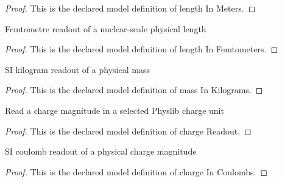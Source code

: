 \begin{proof}
  This is the declared model definition of length In Meters.
\end{proof}
\begin{definition}
  \label{def:physics:phyx-mini-0635:phyxminiproblems-problemphyxmini0635-lengthinfemtometers}
  Femtometre readout of a nuclear-scale physical length
\end{definition}
\begin{proof}
  This is the declared model definition of length In Femtometers.
\end{proof}
\begin{definition}
  \label{def:physics:phyx-mini-0635:phyxminiproblems-problemphyxmini0635-massinkilograms}
  SI kilogram readout of a physical mass
\end{definition}
\begin{proof}
  This is the declared model definition of mass In Kilograms.
\end{proof}
\begin{definition}
  \label{def:physics:phyx-mini-0635:phyxminiproblems-problemphyxmini0635-chargereadout}
  Read a charge magnitude in a selected Physlib charge unit
\end{definition}
\begin{proof}
  This is the declared model definition of charge Readout.
\end{proof}
\begin{definition}
  \label{def:physics:phyx-mini-0635:phyxminiproblems-problemphyxmini0635-chargeincoulombs}
  SI coulomb readout of a physical charge magnitude
\end{definition}
\begin{proof}
  This is the declared model definition of charge In Coulombs.
\end{proof}
